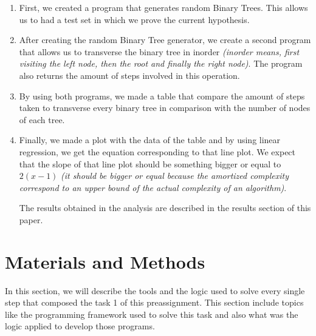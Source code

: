 \documentclass[12p]{article}
\begin{document}
\begin{enumerate}

  \item First, we created a program that generates random Binary Trees. This allows us to had a test set in which we prove the current hypothesis.
  \item After creating the random Binary Tree generator, we create a second program that allows us to transverse the binary tree in inorder \textit{(inorder means, first visiting the left node, then the root and finally the right node)}. The program also returns the amount of steps involved in this operation.
  \item By using both programs, we made a table that compare the amount of steps taken to transverse every binary tree in comparison with the number of nodes of each tree.
  \item Finally, we made a plot with the data of the table and by using linear regression, we get the equation corresponding to that line plot. We expect that the slope of that line plot should be something bigger or equal to $2(x-1)$ \textit{(it should be bigger or equal because the amortized complexity correspond to an upper bound of the actual complexity of an algorithm)}.

\bigskip

The results obtained in the analysis are described in the results section of this paper.

\end{enumerate}



  \section{Materials and Methods}
In this section, we will describe the tools and the logic used to solve every single step that composed the task 1 of this preassignment. This section include topics like the programming framework used to solve this task and also what was the logic applied to develop those programs.


\end{document}
